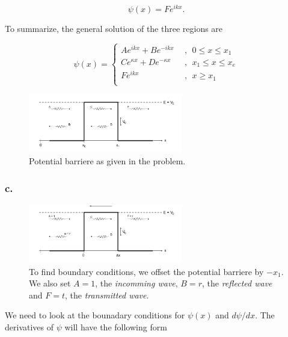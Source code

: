 \documentclass{article}
\begin{document}
\begin{equation}
\psi(x) = Fe^{ikx}.
\end{equation}

To summarize, the general solution of the three regions are

\begin{equation}
\psi(x) = \begin{cases}
Ae^{ikx} + Be^{-ikx} \ \ &, \ \ 0 \leq x \leq x_1 \\
Ce^{\kappa x} + De^{-\kappa x} \ \ &, \ \ x_1 \leq x \leq x_e \\
Fe^{ikx}  &, \ \ x \geq x_1 \\
\end{cases}
\end{equation}


\begin{figure}[t]
\centering
\includegraphics[width=0.6\textwidth]{potentialbarriere}
\caption{Potential barriere as given in the problem.}
\label{fig:figure_label}
\end{figure}


\subsubsection*{c.}

\begin{figure}[t]
\centering
\includegraphics[width=0.6\textwidth]{potentialbarriereoffset}
\caption{To find boundary conditions, we offset the potential barriere by $-x_1$. We also set $A=1$, the \textit{incomming wave}, $B=r$, the \textit{reflected wave} and $F=t$, the \textit{transmitted wave}.}
\label{fig:figure_label}
\end{figure}

We need to look at the bounadary conditions for $\psi(x)$ and $d\psi/dx$. The derivatives of $\psi$ will have the following form
\end{document}
